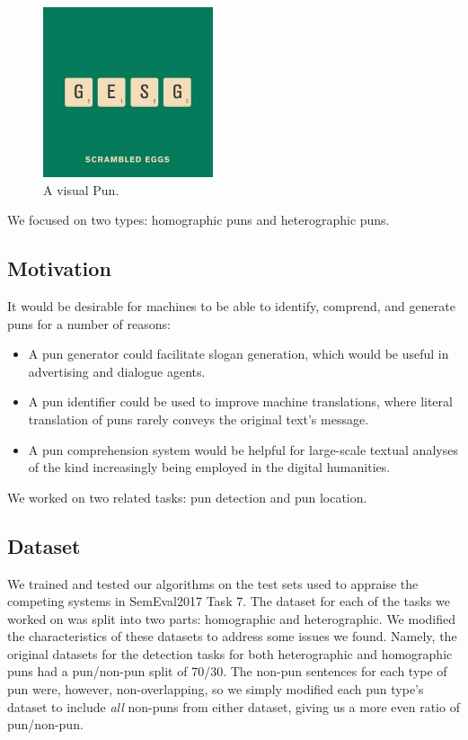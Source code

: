 \documentclass{article}
\begin{document}
\begin{figure}
\centering
\includegraphics[width=5cm]{figures/visual_pun.jpg}
\caption{A visual Pun.}\label{fig:visual_pun}
\end{figure}

We focused on two types: homographic puns and heterographic puns. 

\subsection{Motivation}

It would be desirable for machines to be able to identify, comprend, and
generate puns for a number of reasons:

\begin{itemize}
	\item A pun generator could facilitate slogan generation, which would be
		useful in advertising and dialogue agents.
	\item A pun identifier could be used to improve machine translations, where
		literal translation of puns rarely conveys the original text's message.
	\item A pun comprehension system would be helpful for large-scale textual
		analyses of the kind increasingly being employed in the digital
		humanities.
\end{itemize}

We worked on two related tasks: pun detection and pun location.

\subsection{Dataset}

We trained and tested our algorithms on the test sets used to appraise the
competing systems in SemEval2017 Task 7. The dataset for each of the tasks we
worked on was split into two parts: homographic and heterographic. We modified
the characteristics of these datasets to address some issues we found. Namely,
the original datasets for the detection tasks for both heterographic and
homographic puns had a pun/non-pun split of 70/30. The non-pun sentences for
each type of pun were, however, non-overlapping, so we simply modified each pun
type's dataset to include \emph{all} non-puns from either dataset, giving us a
more even ratio of pun/non-pun.\ 
\end{document}
